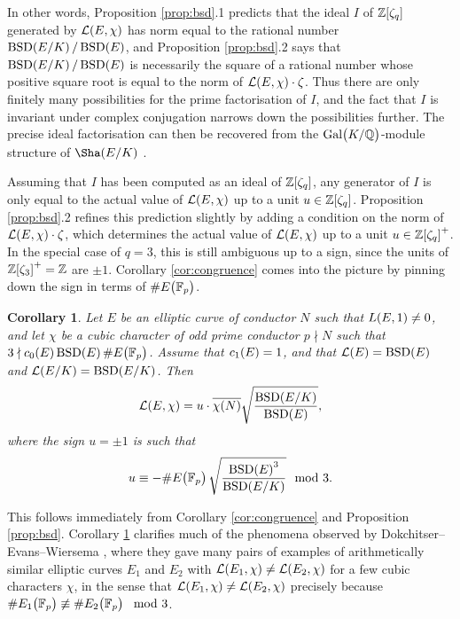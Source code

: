 \documentclass{article}
\theoremstyle{plain}
\newtheorem{corollary}[n]{Corollary}
\theoremstyle{definition}
\newcommand{\BSD}{\operatorname{BSD}}
\newcommand{\FF}{\mathbb{F}}
\newcommand{\Gal}{\operatorname{Gal}}
\newcommand{\LLL}{\mathcal{L}}
\newcommand{\QQ}{\mathbb{Q}}
\newcommand{\ZZ}{\mathbb{Z}}
\newcommand{\br}{\!\del}
\begin{document}
In other words, Proposition \ref{prop:bsd}.1 predicts that the ideal $ I $ of $ \ZZ\sbr[0]{\zeta_q} $ generated by $ \LLL\br{E, \chi} $ has norm equal to the rational number $ \BSD\br[0]{E / K} / \BSD\br{E} $, and Proposition \ref{prop:bsd}.2 says that $ \BSD\br[0]{E / K} / \BSD\br{E} $ is necessarily the square of a rational number whose positive square root is equal to the norm of $ \LLL\br{E, \chi} \cdot \zeta $. Thus there are only finitely many possibilities for the prime factorisation of $ I $, and the fact that $ I $ is invariant under complex conjugation narrows down the possibilities further. The precise ideal factorisation can then be recovered from the $ \Gal\br{K / \QQ} $-module structure of $ \Sha\br[0]{E / K} $ \cite[Remark 7.4]{BC21}.

Assuming that $ I $ has been computed as an ideal of $ \ZZ\sbr[0]{\zeta_q} $, any generator of $ I $ is only equal to the actual value of $ \LLL\br{E, \chi} $ up to a unit $ u \in \ZZ\sbr[0]{\zeta_q} $. Proposition \ref{prop:bsd}.2 refines this prediction slightly by adding a condition on the norm of $ \LLL\br{E, \chi} \cdot \zeta $, which determines the actual value of $ \LLL\br{E, \chi} $ up to a unit $ u \in \ZZ\sbr[0]{\zeta_q}^+ $. In the special case of $ q = 3 $, this is still ambiguous up to a sign, since the units of $ \ZZ\sbr{\zeta_3}^+ = \ZZ $ are $ \pm1 $. Corollary \ref{cor:congruence} comes into the picture by pinning down the sign in terms of $ \#E\br{\FF_p} $.

\begin{corollary}
\label{cor:cubic}
Let $ E $ be an elliptic curve of conductor $ N $ such that $ L\br{E, 1} \ne 0 $, and let $ \chi $ be a cubic character of odd prime conductor $ p \nmid N $ such that $ 3 \nmid c_0\br{E}\BSD\br{E}\#E\br{\FF_p} $. Assume that $ c_1\br{E} = 1 $, and that $ \LLL\br{E} = \BSD\br{E} $ and $ \LLL\br[0]{E / K} = \BSD\br[0]{E / K} $. Then
$$ \LLL\br{E, \chi} = u \cdot \overline{\chi\br{N}}\sqrt{\dfrac{\BSD\br[0]{E / K}}{\BSD\br{E}}}, $$
where the sign $ u = \pm1 $ is such that
$$ u \equiv -\#E\br{\FF_p}\sqrt{\dfrac{\BSD\br{E}^3}{\BSD\br[0]{E / K}}} \mod 3. $$
\end{corollary}

This follows immediately from Corollary \ref{cor:congruence} and Proposition \ref{prop:bsd}. Corollary \ref{cor:cubic} clarifies much of the phenomena observed by Dokchitser--Evans--Wiersema \cite[Example 45]{DEW21}, where they gave many pairs of examples of arithmetically similar elliptic curves $ E_1 $ and $ E_2 $ with $ \LLL\br{E_1, \chi} \ne \LLL\br{E_2, \chi} $ for a few cubic characters $ \chi $, in the sense that $ \LLL\br{E_1, \chi} \ne \LLL\br{E_2, \chi} $ precisely because $ \#E_1\br{\FF_p} \not\equiv \#E_2\br{\FF_p} \mod 3 $.
\end{document}
